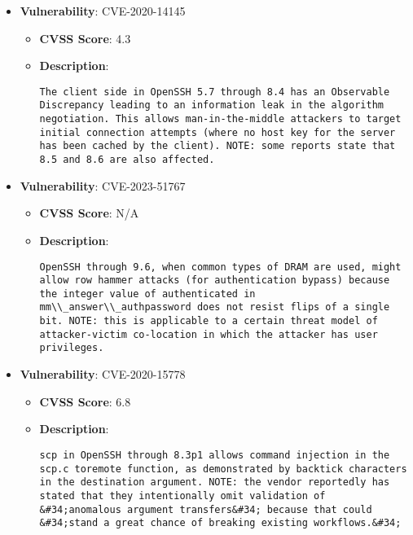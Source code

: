 \documentclass{article}
\begin{document}
\begin{itemize}
        \item \textbf{Vulnerability}: CVE-2020-14145
        \begin{itemize}
            \item \textbf{CVSS Score}:  4.3 
            \item \textbf{Description}:
            \parbox[t]{0.9\linewidth}{
                \verb|The client side in OpenSSH 5.7 through 8.4 has an Observable Discrepancy leading to an information leak in the algorithm negotiation. This allows man-in-the-middle attackers to target initial connection attempts (where no host key for the server has been cached by the client). NOTE: some reports state that 8.5 and 8.6 are also affected.|
            }
        \end{itemize}
    
        \item \textbf{Vulnerability}: CVE-2023-51767
        \begin{itemize}
            \item \textbf{CVSS Score}:  N/A 
            \item \textbf{Description}:
            \parbox[t]{0.9\linewidth}{
                \verb|OpenSSH through 9.6, when common types of DRAM are used, might allow row hammer attacks (for authentication bypass) because the integer value of authenticated in mm\\_answer\\_authpassword does not resist flips of a single bit. NOTE: this is applicable to a certain threat model of attacker-victim co-location in which the attacker has user privileges.|
            }
        \end{itemize}
    
        \item \textbf{Vulnerability}: CVE-2020-15778
        \begin{itemize}
            \item \textbf{CVSS Score}:  6.8 
            \item \textbf{Description}:
            \parbox[t]{0.9\linewidth}{
                \verb|scp in OpenSSH through 8.3p1 allows command injection in the scp.c toremote function, as demonstrated by backtick characters in the destination argument. NOTE: the vendor reportedly has stated that they intentionally omit validation of &#34;anomalous argument transfers&#34; because that could &#34;stand a great chance of breaking existing workflows.&#34;|
            }
        \end{itemize}
    

\end{itemize}
\end{document}
